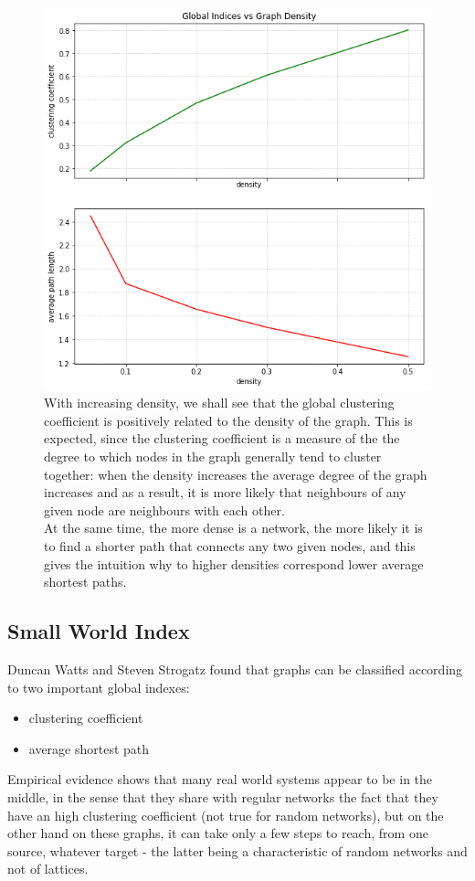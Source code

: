 \documentclass[%
 aip,
 jmp,%
 amsmath,amssymb,
 reprint,%
]{revtex4-1}
\begin{document}
\begin{figure}
	\centering
	\includegraphics[width=0.5\linewidth]{../global_indices_wrt_density}
	\caption{With increasing density, we shall see that the global clustering coefficient is positively related to the density of the graph. This is expected, since the clustering coefficient is a measure of the the degree to which nodes in the graph generally tend to cluster together: when the density increases the average degree of the graph increases and as a result, it is more likely that neighbours of any given node are neighbours with each other.\\ At the same time, the more dense is a network, the more likely it is to find a shorter path that connects any two given nodes, and this gives the intuition why to higher densities correspond lower average shortest paths.}
	\label{fig:globalindiceswrtdensity}
\end{figure}



\subsection{\label{sec:level2}Small World Index}

Duncan Watts and Steven Strogatz \cite{WattsDuncan} found that graphs can be classified according to two important global indexes:

\begin{itemize}
	\item clustering coefficient
	\item average shortest path
\end{itemize}

Empirical evidence shows that many real world systems appear to be in the middle, in the sense that they share with regular networks the fact that they have an high clustering coefficient (not true for random networks), but on the other hand on these graphs, it can take only a few steps to reach, from one source, whatever target - the latter being a characteristic of random networks and not of lattices.
\end{document}
